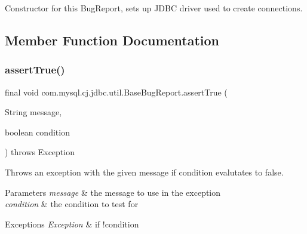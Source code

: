 Constructor for this Bug\+Report, sets up J\+D\+BC driver used to create connections. 

\subsection{Member Function Documentation}
\mbox{\label{classcom_1_1mysql_1_1cj_1_1jdbc_1_1util_1_1_base_bug_report_aeca0d41a625cbf52168bca12a8ba62c8}} 
\subsubsection{\texorpdfstring{assert\+True()}{assertTrue()}\hspace{0.1cm}{\footnotesize\ttfamily [1/2]}}
{\footnotesize\ttfamily final void com.\+mysql.\+cj.\+jdbc.\+util.\+Base\+Bug\+Report.\+assert\+True (\begin{DoxyParamCaption}\item[{String}]{message,  }\item[{boolean}]{condition }\end{DoxyParamCaption}) throws Exception\hspace{0.3cm}{\ttfamily [protected]}}

Throws an exception with the given message if condition evalutates to \textquotesingle{}false\textquotesingle{}.


\begin{DoxyParams}{Parameters}
{\em message} & the message to use in the exception \\
\hline
{\em condition} & the condition to test for \\
\hline
\end{DoxyParams}

\begin{DoxyExceptions}{Exceptions}
{\em Exception} & if !condition \\
\hline
\end{DoxyExceptions}
\mbox{\label{classcom_1_1mysql_1_1cj_1_1jdbc_1_1util_1_1_base_bug_report_a70e82a2b3e425014402a19483020f278}} 
